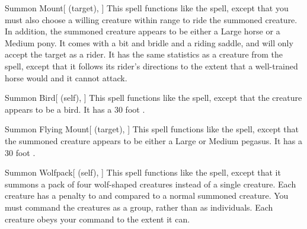 \lowercase{\hypertarget{spell:Summon Mount}{}}\label{spell:Summon Mount}
\begin{attuneability}[\nth{2}]{\hypertarget{spell:Summon Mount}{Summon Mount}}[ (target), ]
This spell functions like the  spell, except that you must also choose a willing creature within \rngmed range to ride the summoned creature.
In addition, the summoned creature appears to be either a Large horse or a Medium pony.
It comes with a bit and bridle and a riding saddle, and will only accept the target as a rider.
It has the same statistics as a creature from the  spell, except that it follows its rider's directions to the extent that a well-trained horse would and it cannot attack.
\end{attuneability}
\vspace{0.25em}



\lowercase{\hypertarget{spell:Summon Bird}{}}\label{spell:Summon Bird}
\begin{attuneability}[\nth{3}]{\hypertarget{spell:Summon Bird}{Summon Bird}}[ (self), ]
This spell functions like the  spell, except that the creature appears to be a bird.
It has a 30 foot .
\end{attuneability}
\vspace{0.25em}



\lowercase{\hypertarget{spell:Summon Flying Mount}{}}\label{spell:Summon Flying Mount}
\begin{attuneability}[\nth{4}]{\hypertarget{spell:Summon Flying Mount}{Summon Flying Mount}}[ (target), ]
This spell functions like the  spell, except that the summoned creature appears to be either a Large or Medium pegasus.
It has a 30 foot .
\end{attuneability}
\vspace{0.25em}



\lowercase{\hypertarget{spell:Summon Wolfpack}{}}\label{spell:Summon Wolfpack}
\begin{attuneability}[\nth{4}]{\hypertarget{spell:Summon Wolfpack}{Summon Wolfpack}}[ (self), ]
This spell functions like the  spell, except that it summons a pack of four wolf-shaped creatures instead of a single creature.
Each creature has a  penalty to  and  compared to a normal summoned creature.
You must command the creatures as a group, rather than as individuals.
Each creature obeys your command to the extent it can.
\end{attuneability}
\vspace{0.25em}



